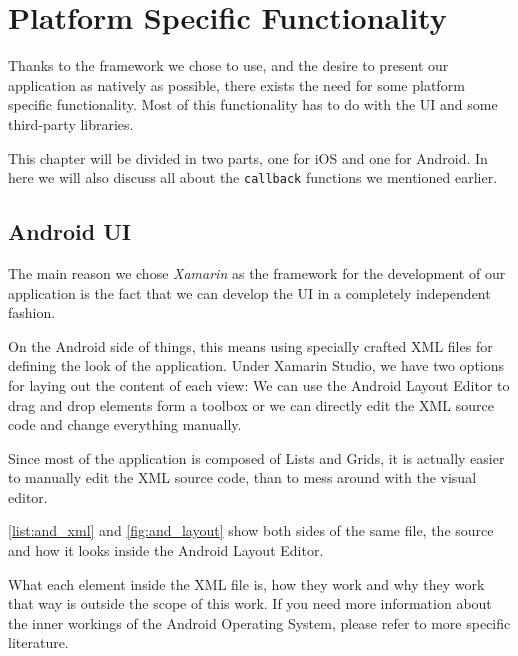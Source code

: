 \chapter{Platform Specific Functionality}\label{ch:ui}

Thanks to the framework we chose to use, and the desire to present our application as natively as possible, there exists the need for some platform specific functionality. Most of this functionality has to do with the \ac{UI} and some third-party libraries.

This chapter will be divided in two parts, one for iOS and one for Android. In here we will also discuss all about the \texttt{callback} functions we mentioned earlier. 

\section{Android UI}

The main reason we chose \textit{Xamarin} as the framework for the development of our application is the fact that we can develop the \ac{UI} in a completely independent fashion.

On the Android side of things, this means using specially crafted \ac{XML} files for defining the look of the application. Under Xamarin Studio, we have two options for laying out the content of each view:  We can use the Android Layout Editor to drag and drop elements form a toolbox or we can  directly edit the \ac{XML} source code and change everything manually.

Since most of the application is composed of Lists and Grids, it is actually easier to manually edit the \ac{XML} source code, than to mess around with the visual editor.

\autoref{list:and_xml} and \autoref{fig:and_layout} show both sides of the same file, the source and how it looks inside the Android Layout Editor.

What each element inside the \ac{XML} file is, how they work and why they work that way is outside the scope of this work. If you need more information about the inner workings of the Android Operating System, please refer to more specific literature.


